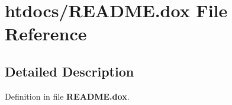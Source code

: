 \section{htdocs/\-R\-E\-A\-D\-M\-E.dox \-File \-Reference}
\label{README_8dox}


\subsection{\-Detailed \-Description}


\-Definition in file {\bf \-R\-E\-A\-D\-M\-E.\-dox}.


